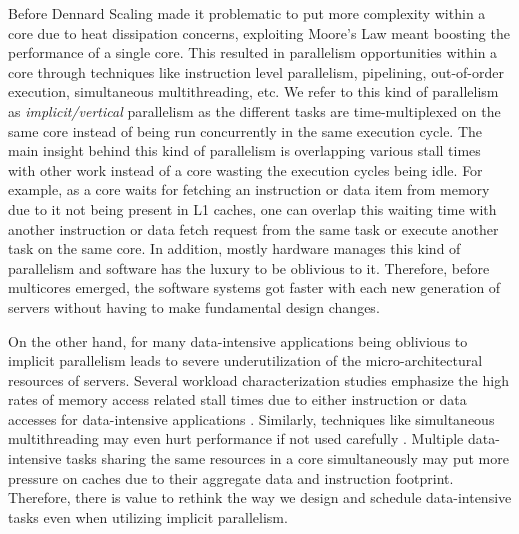 \documentclass[11pt,dvipdfm]{article}
\begin{document}
Before Dennard Scaling made it problematic to put more complexity within a core due to heat dissipation concerns,
exploiting Moore's Law meant boosting the performance of a single core.
This resulted in parallelism opportunities within a core through techniques like
instruction level parallelism, pipelining, out-of-order execution, simultaneous multithreading, etc.
We refer to this kind of parallelism as \textit{implicit/vertical} parallelism
as the different tasks are time-multiplexed on the same core
instead of being run concurrently in the same execution cycle.
The main insight behind this kind of parallelism is overlapping various stall times with other work
instead of a core wasting the execution cycles being idle.
For example, as a core waits for fetching an instruction or data item from memory due to it not being present in L1 caches,
one can overlap this waiting time with another instruction or data fetch request from the same task
or execute another task on the same core.
In addition, mostly hardware manages this kind of parallelism and software has the luxury to be oblivious to it.
Therefore, before multicores emerged,
the software systems got faster with each new generation of servers without having to make fundamental design changes.

On the other hand, 
for many data-intensive applications being oblivious to implicit parallelism leads to severe underutilization of
the micro-architectural resources of servers.
Several workload characterization studies emphasize the high rates of memory access related stall times
due to either instruction or data accesses for data-intensive applications \cite{Ferdman+12, SirinTPA16}.
Similarly, techniques like simultaneous multithreading may even hurt performance if not used carefully \cite{ZhouCRS05}.
Multiple data-intensive tasks sharing the same resources in a core simultaneously may put more pressure on caches
due to their aggregate data and instruction footprint.
Therefore,
there is value to rethink the way we design and schedule data-intensive tasks even when utilizing implicit parallelism.
\end{document}
